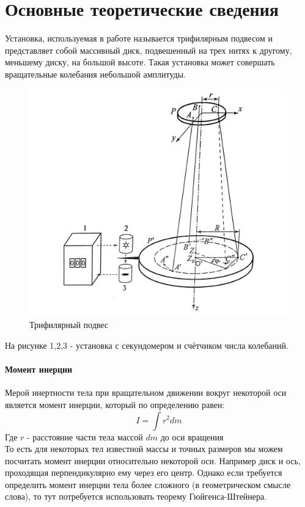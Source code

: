 \documentclass[a4paper,12pt]{article}
\begin{document}
	\section{Основные теоретические сведения}
	Установка, используемая в работе называется трифилярным подвесом и представляет собой массивный диск, подвешенный на трех нитях к другому, меньшему диску, на большой высоте. Такая установка может совершать вращательные колебания небольшой амплитуды.
	\begin{figure}[H]
		\centering
		\includegraphics[width=0.7\linewidth]{fig1}
		\caption[]{Трифилярный подвес}
		\label{fig:fig1}
	\end{figure}
	
	На рисунке 1,2,3 - установка с секундомером и счётчиком числа колебаний.\\
	
	\paragraph{Момент инерции}
	Мерой инертности тела при вращательном движении вокруг некоторой оси является момент инерции, который по определению равен:
	\begin{equation}
		I=\int r^2dm
	\end{equation}
	Где $r$ - расстояние части тела массой $dm$ до оси вращения\\
	
	То есть для некоторых тел известной массы и точных размеров мы можем посчитать момент инерции относительно некоторой оси. Например диск и ось, проходящая перпендикулярно ему через его центр. Однако если требуется определить момент инерции тела более сложного (в геометрическом смысле слова), то тут потребуется использовать теорему Гюйгенса-Штейнера.
	
\end{document}
